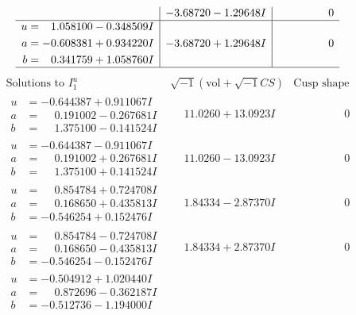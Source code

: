 \documentclass[1p]{elsarticle_modified}
\theoremstyle{definition}
\newcommand{\I}{\sqrt{-1}}
\begin{document}
$$\begin{array}{c|c|c}
 & -3.68720 - 1.29648 I & \phantom{-0.000000 } 0 \\ \hline\begin{aligned}
u &= \phantom{-}1.058100 - 0.348509 I \\
a &= -0.608381 + 0.934220 I \\
b &= \phantom{-}0.341759 + 1.058760 I\end{aligned}
 & -3.68720 + 1.29648 I & \phantom{-0.000000 } 0\\
 \hline 
 \end{array}$$\newpage$$\begin{array}{c|c|c}  
\text{Solutions to }I^u_{1}& \I (\text{vol} + \sqrt{-1}CS) & \text{Cusp shape}\\
 \hline 
\begin{aligned}
u &= -0.644387 + 0.911067 I \\
a &= \phantom{-}0.191002 - 0.267681 I \\
b &= \phantom{-}1.375100 - 0.141524 I\end{aligned}
 & \phantom{-}11.0260 + 13.0923 I & \phantom{-0.000000 } 0 \\ \hline\begin{aligned}
u &= -0.644387 - 0.911067 I \\
a &= \phantom{-}0.191002 + 0.267681 I \\
b &= \phantom{-}1.375100 + 0.141524 I\end{aligned}
 & \phantom{-}11.0260 - 13.0923 I & \phantom{-0.000000 } 0 \\ \hline\begin{aligned}
u &= \phantom{-}0.854784 + 0.724708 I \\
a &= \phantom{-}0.168650 + 0.435813 I \\
b &= -0.546254 + 0.152476 I\end{aligned}
 & \phantom{-}1.84334 - 2.87370 I & \phantom{-0.000000 } 0 \\ \hline\begin{aligned}
u &= \phantom{-}0.854784 - 0.724708 I \\
a &= \phantom{-}0.168650 - 0.435813 I \\
b &= -0.546254 - 0.152476 I\end{aligned}
 & \phantom{-}1.84334 + 2.87370 I & \phantom{-0.000000 } 0 \\ \hline\begin{aligned}
u &= -0.504912 + 1.020440 I \\
a &= \phantom{-}0.872696 - 0.362187 I \\
b &= -0.512736 - 1.194000 I\end{aligned}

\end{array}$$
\end{document}
